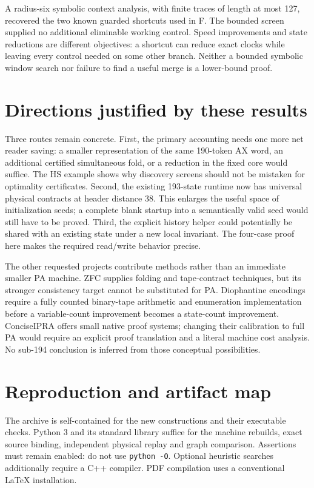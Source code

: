 \documentclass[11pt,a4paper]{article}
\begin{document}
A radius-six symbolic context analysis, with finite traces of length at
most 127, recovered the two known guarded shortcuts used in F. The
bounded screen supplied no additional eliminable working control.
Speed improvements and state reductions are different objectives: a
shortcut can reduce exact clocks while leaving every control needed on
some other branch. Neither a bounded symbolic window search nor failure
to find a useful merge is a lower-bound proof.




\section{Directions justified by these results}

Three routes remain concrete. First, the primary accounting needs one
more net reader saving: a smaller representation of the same 190-token
AX word, an additional certified simultaneous fold, or a reduction in the
fixed core would suffice. The HS example shows why discovery screens
should not be mistaken for optimality certificates. Second, the existing
193-state runtime now has universal physical contracts at header distance
38. This enlarges the useful space of initialization seeds; a complete
blank startup into a semantically valid seed would still have to be
proved. Third, the explicit history helper could potentially be shared
with an existing state under a new local invariant. The four-case proof
here makes the required read/write behavior precise.

The other requested projects contribute methods rather than an immediate
smaller PA machine. ZFC supplies folding and tape-contract techniques,
but its stronger consistency target cannot be substituted for PA.
Diophantine encodings require a fully counted binary-tape arithmetic and
enumeration implementation before a variable-count improvement becomes a
state-count improvement. ConciseIPRA offers small native proof systems;
changing their calibration to full PA would require an explicit proof
translation and a literal machine cost analysis. No sub-194 conclusion
is inferred from those conceptual possibilities.

\section{Reproduction and artifact map}
\label{sec:reproduction}

The archive is self-contained for the new constructions and their
executable checks. Python 3 and its standard library suffice for the
machine rebuilds, exact source binding, independent physical replay and
graph comparison. Assertions must remain enabled: do not use
\texttt{python -O}. Optional heuristic searches additionally require a
C++ compiler. PDF compilation uses a conventional LaTeX installation.
\end{document}
